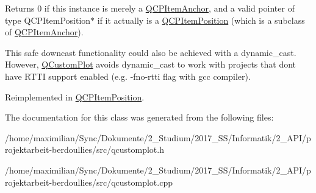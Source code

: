 Returns 0 if this instance is merely a \hyperlink{class_q_c_p_item_anchor}{Q\+C\+P\+Item\+Anchor}, and a valid pointer of type Q\+C\+P\+Item\+Position$\ast$ if it actually is a \hyperlink{class_q_c_p_item_position}{Q\+C\+P\+Item\+Position} (which is a subclass of \hyperlink{class_q_c_p_item_anchor}{Q\+C\+P\+Item\+Anchor}).

This safe downcast functionality could also be achieved with a dynamic\+\_\+cast. However, \hyperlink{class_q_custom_plot}{Q\+Custom\+Plot} avoids dynamic\+\_\+cast to work with projects that don\textquotesingle{}t have R\+T\+TI support enabled (e.\+g. -\/fno-\/rtti flag with gcc compiler). 

Reimplemented in \hyperlink{class_q_c_p_item_position_a008ff9ebe645a963671b68bcf7f7a1c0}{Q\+C\+P\+Item\+Position}.



The documentation for this class was generated from the following files\+:\begin{DoxyCompactItemize}
\item 
/home/maximilian/\+Sync/\+Dokumente/2\+\_\+\+Studium/2017\+\_\+\+S\+S/\+Informatik/2\+\_\+\+A\+P\+I/projektarbeit-\/berdoullies/src/qcustomplot.\+h\item 
/home/maximilian/\+Sync/\+Dokumente/2\+\_\+\+Studium/2017\+\_\+\+S\+S/\+Informatik/2\+\_\+\+A\+P\+I/projektarbeit-\/berdoullies/src/qcustomplot.\+cpp\end{DoxyCompactItemize}
